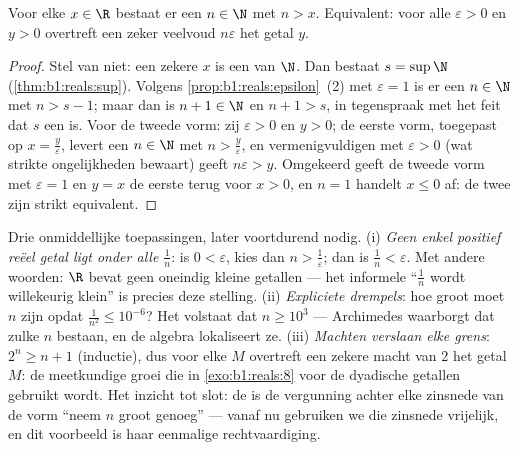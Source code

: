 \begin{theorem}\label{thm:b1:reals:archimedes}
Voor elke $x \in \R$ bestaat er een $n \in \N$ met $n > x$. Equivalent:
voor alle $\varepsilon > 0$ en $y > 0$ overtreft een zeker veelvoud
$n\varepsilon$ het getal $y$.
\end{theorem}

\begin{proof}
Stel van niet: een zekere $x$ is een  van $\N$. Dan bestaat $s
= \sup \N$ (\cref{thm:b1:reals:sup}). Volgens
\cref{prop:b1:reals:epsilon}~(2) met $\varepsilon = 1$ is er een $n \in
\N$ met $n > s - 1$; maar dan is $n + 1 \in \N$ en $n + 1 > s$, in
tegenspraak met het feit dat $s$ een  is. Voor de tweede vorm:
zij $\varepsilon > 0$ en $y > 0$; de eerste vorm, toegepast op $x =
\frac{y}{\varepsilon}$, levert een $n \in \N$ met $n >
\frac{y}{\varepsilon}$, en vermenigvuldigen met $\varepsilon > 0$ (wat
strikte ongelijkheden bewaart) geeft $n\varepsilon > y$. Omgekeerd geeft
de tweede vorm met $\varepsilon = 1$ en $y = x$ de eerste terug voor $x >
0$, en $n = 1$ handelt $x \leq 0$ af: de twee  zijn strikt
equivalent.
\end{proof}

\begin{example}\label{ex:b1:reals:archimedeswork}
Drie onmiddellijke toepassingen, later voortdurend nodig. (i) \emph{Geen
enkel positief reëel getal ligt onder alle $\frac1n$}: is $0 <
\varepsilon$, kies dan $n > \frac1\varepsilon$; dan is $\frac1n <
\varepsilon$. Met andere woorden: $\R$ bevat geen oneindig kleine
getallen --- het informele ``$\frac1n$ wordt willekeurig klein'' is
precies deze stelling. (ii) \emph{Expliciete drempels}: hoe groot moet
$n$ zijn opdat $\frac{1}{n^2} \leq 10^{-6}$? Het volstaat dat $n \geq
10^3$ --- Archimedes waarborgt dat zulke $n$ bestaan, en de algebra
lokaliseert ze. (iii) \emph{Machten verslaan elke grens}: $2^n \geq n +
1$ (inductie), dus voor elke $M$ overtreft een zekere macht van $2$ het
getal $M$: de meetkundige groei die in \cref{exo:b1:reals:8} voor de
dyadische getallen gebruikt wordt. Het inzicht tot slot: de
 is de vergunning achter elke zinsnede van de
vorm ``neem $n$ groot genoeg'' --- vanaf nu gebruiken we die zinsnede
vrijelijk, en dit voorbeeld is haar eenmalige rechtvaardiging.
\end{example}


